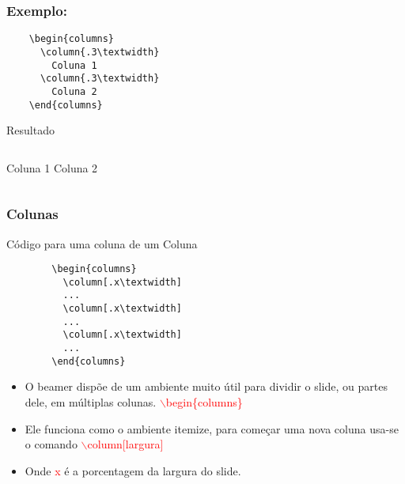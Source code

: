 
\begin{frame}[fragile]
  \frametitle{Exemplo:}

  \begin{verbatim}
    \begin{columns}
      \column{.3\textwidth}
        Coluna 1
      \column{.3\textwidth}
        Coluna 2
    \end{columns}
  \end{verbatim}

  \begin{block}{Resultado}
    \begin{center}
     \begin{columns}
         Coluna 1
        Coluna 2
    \end{columns}
    \end{center}
  \end{block}
\end{frame}
\begin{frame}[fragile]
  \frametitle{Colunas}

  \begin{block}{Código para uma coluna de um Coluna}
    \begin{verbatim}
        \begin{columns}
          \column[.x\textwidth]
          ...
          \column[.x\textwidth]
          ...
          \column[.x\textwidth]
          ...
        \end{columns}
    \end{verbatim}
  \end{block}

  \begin{block}{}
    \begin{itemize}
       \item O beamer dispõe de um ambiente muito útil para dividir o
            slide, ou partes dele, em múltiplas colunas.  \textcolor{red}{ $\backslash$begin\{columns\}}
       \item Ele funciona como o ambiente itemize, para começar uma nova coluna usa-se o comando
             \textcolor{red} { $\backslash$column[largura]}
       \item Onde \textcolor{red}{x} é a porcentagem da largura do slide.
    \end{itemize}

  \end{block}

\end{frame}

